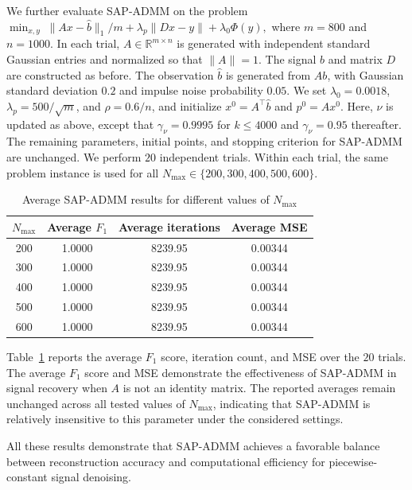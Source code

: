 {\color{blue}
We further evaluate SAP-ADMM on the problem
\(
\min_{x,y}\;
\|Ax-\hat b\|_1/m
+\lambda_p\|Dx-y\|
+\lambda_0\Phi(y),
\)
where \(m=800\) and \(n=1000\).
In each trial, \(A\in\mathbb{R}^{m\times n}\) is generated
with independent standard Gaussian entries and normalized
so that \(\|A\|=1\).
The signal \(b\) and matrix \(D\) are constructed as before.
The observation \(\hat b\) is generated from \(Ab\), with Gaussian standard deviation
\(0.2\) and impulse noise probability \(0.05\).
We set \(\lambda_0=0.0018\), \(\lambda_p=500/\sqrt{m}\),
and \(\rho=0.6/n\), and initialize
\(x^0=A^\top\hat b\) and \(p^0=Ax^0\). Here, \(\nu\) is updated as above, except that
\(\gamma_\nu=0.9995\) for \(k\leq4000\) and
\(\gamma_\nu=0.95\) thereafter.
The remaining parameters, initial points, and stopping
criterion for SAP-ADMM are unchanged.
We perform \(20\) independent trials.
Within each trial, the same problem instance is used for all
\(N_{\mathrm{max}}\in\{200,300,400,500,600\}\).

\begin{table}[htbp]
\color{blue}
\centering
\small
\caption{Average SAP-ADMM results for different values of \(N_{\mathrm{max}}\)}
\label{tab:nmax_general_A}
\renewcommand{\arraystretch}{1.05}
\setlength{\tabcolsep}{10pt}
\begin{tabular}{cccc}
\toprule
\(N_{\mathrm{max}}\)
& Average \(F_1\)
& Average iterations
& Average MSE \\
\midrule
200 & 1.0000 & 8239.95 & 0.00344 \\
300 & 1.0000 & 8239.95 & 0.00344 \\
400 & 1.0000 & 8239.95 & 0.00344 \\
500 & 1.0000 & 8239.95 & 0.00344 \\
600 & 1.0000 & 8239.95 & 0.00344 \\
\bottomrule
\end{tabular}
\end{table}

Table~\ref{tab:nmax_general_A} reports the average \(F_1\)
score, iteration count, and MSE over the \(20\) trials.
The average \(F_1\) score and MSE demonstrate the effectiveness
of SAP-ADMM in signal recovery when \(A\) is not an identity matrix.
The reported averages remain unchanged across all tested
values of \(N_{\mathrm{max}}\), indicating that SAP-ADMM
is relatively insensitive to this parameter under the
considered settings.
}

All these results demonstrate that SAP-ADMM achieves a favorable balance
between reconstruction accuracy and computational efficiency
for piecewise-constant signal denoising.

